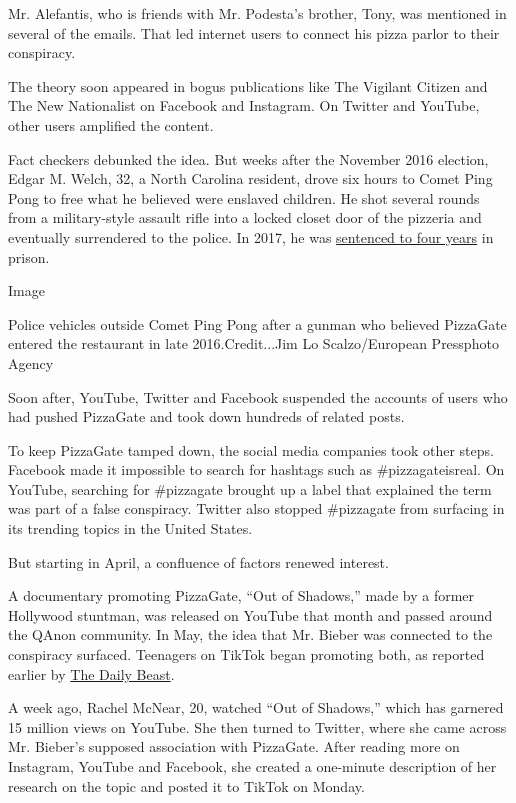 Mr. Alefantis, who is friends with Mr. Podesta's brother, Tony, was
mentioned in several of the emails. That led internet users to connect
his pizza parlor to their conspiracy.

The theory soon appeared in bogus publications like The Vigilant Citizen
and The New Nationalist on Facebook and Instagram. On Twitter and
YouTube, other users amplified the content.

Fact checkers debunked the idea. But weeks after the November 2016
election, Edgar M. Welch, 32, a North Carolina resident, drove six hours
to Comet Ping Pong to free what he believed were enslaved children. He
shot several rounds from a military-style assault rifle into a locked
closet door of the pizzeria and eventually surrendered to the police. In
2017, he was
\href{https://www.nytimes3xbfgragh.onion/2017/06/22/us/pizzagate-attack-sentence.html}{sentenced
to four years} in prison.

Image

Police vehicles outside Comet Ping Pong after a gunman who believed
PizzaGate entered the restaurant in late 2016.Credit...Jim Lo
Scalzo/European Pressphoto Agency

Soon after, YouTube, Twitter and Facebook suspended the accounts of
users who had pushed PizzaGate and took down hundreds of related posts.

To keep PizzaGate tamped down, the social media companies took other
steps. Facebook made it impossible to search for hashtags such as
\#pizzagateisreal. On YouTube, searching for \#pizzagate brought up a
label that explained the term was part of a false conspiracy. Twitter
also stopped \#pizzagate from surfacing in its trending topics in the
United States.

But starting in April, a confluence of factors renewed interest.

A documentary promoting PizzaGate, ``Out of Shadows,'' made by a former
Hollywood stuntman, was released on YouTube that month and passed around
the QAnon community. In May, the idea that Mr. Bieber was connected to
the conspiracy surfaced. Teenagers on TikTok began promoting both, as
reported earlier by
\href{https://www.thedailybeast.com/tiktok-teens-are-obsessed-with-pizzagate}{The
Daily Beast}.

A week ago, Rachel McNear, 20, watched ``Out of Shadows,'' which has
garnered 15 million views on YouTube. She then turned to Twitter, where
she came across Mr. Bieber's supposed association with PizzaGate. After
reading more on Instagram, YouTube and Facebook, she created a
one-minute description of her research on the topic and posted it to
TikTok on Monday.

